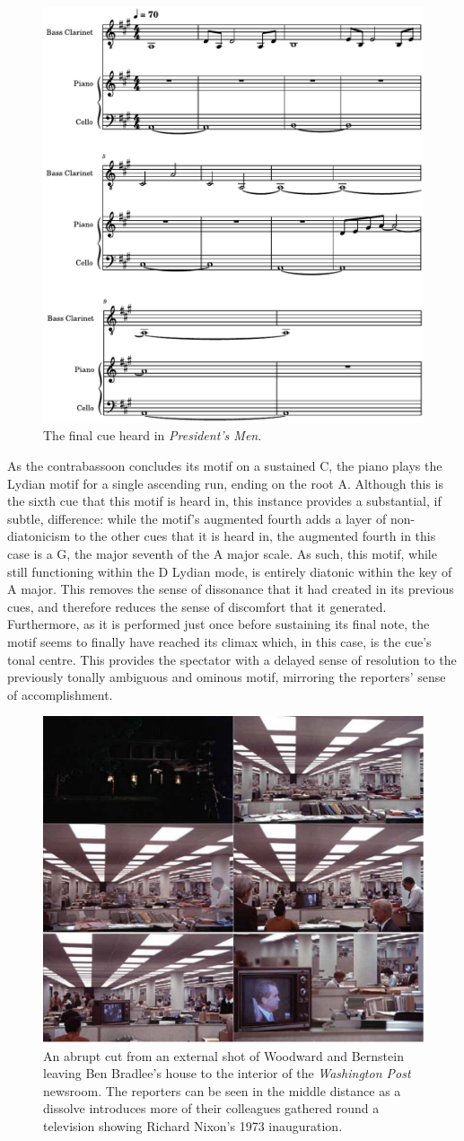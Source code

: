\begin{figure}
    \centering
    \includegraphics[width=0.5\linewidth]{img/president-bradlee-lawn.pdf}
    \caption{The final cue heard in \textit{President's Men}.}
    \label{fig:president-bradlee-lawn}
\end{figure}

As the contrabassoon concludes its motif on a sustained C\sharp, the piano plays the Lydian motif for a single ascending run, ending on the root A.
Although this is the sixth cue that this motif is heard in, this instance provides a substantial, if subtle, difference:
while the motif's augmented fourth adds a layer of non-diatonicism to the other cues that it is heard in, the augmented fourth in this case is a G\sharp, the major seventh of the A major scale.
As such, this motif, while still functioning within the D Lydian mode, is entirely diatonic within the key of A major.
This removes the sense of dissonance that it had created in its previous cues, and therefore reduces the sense of discomfort that it generated.
Furthermore, as it is performed just once before sustaining its final note, the motif seems to finally have reached its climax which, in this case, is the cue's tonal centre.
This provides the spectator with a delayed sense of resolution to the previously tonally ambiguous and ominous motif, mirroring the reporters' sense of accomplishment.
\begin{figure}
    \centering
    \includegraphics[width=0.5\linewidth]{img/president-ending-dissolve.pdf}
    \caption{An abrupt cut from an external shot of Woodward and Bernstein leaving Ben Bradlee's house to the interior of the \textit{Washington Post} newsroom. The reporters can be seen in the middle distance as a dissolve introduces more of their colleagues gathered round a television showing Richard Nixon's 1973 inauguration.}
    \label{fig:president-ending-dissolve}
\end{figure}


